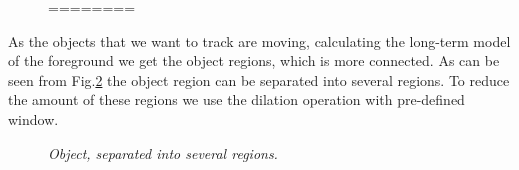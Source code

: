 \documentclass[12pt,a4paper,oneside,titlepage]{article}
\begin{document}
\begin{figure}[h]
\begin{minipage}[h]{0.19\linewidth}
	\end{minipage}

	\caption{========}
	\label{ris:image1}
\end{figure}



As the objects that we want to track are moving, calculating the long-term model of  the foreground we get the object regions, which is more connected.
As can be seen from Fig.\ref{fig:fig3} the object region can be separated into several regions.
To reduce the amount of these regions we use the dilation operation with pre-defined window.


\begin{figure}[h]
  \caption{\textit{Object, separated into several regions.}}
  \label{fig:fig3}
\end{figure}
\end{document}
